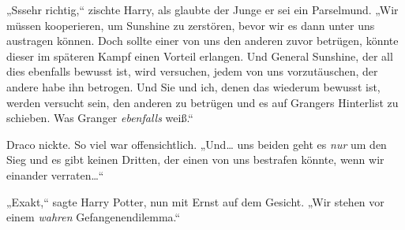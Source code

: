 „Sssehr richtig,“ zischte Harry, als glaubte der Junge er sei ein Parselmund. „Wir müssen kooperieren, um Sunshine zu zerstören, bevor wir es dann unter uns austragen können. Doch sollte einer von uns den anderen zuvor betrügen, könnte dieser im späteren Kampf einen Vorteil erlangen. Und General Sunshine, der all dies ebenfalls bewusst ist, wird versuchen, jedem von uns vorzutäuschen, der andere habe ihn betrogen. Und Sie und ich, denen das wiederum bewusst ist, werden versucht sein, den anderen zu betrügen und es auf Grangers Hinterlist zu schieben. Was Granger \emph{ebenfalls} weiß.“

Draco nickte. So viel war offensichtlich. „Und… uns beiden geht es \emph{nur} um den Sieg und es gibt keinen Dritten, der einen von uns bestrafen könnte, wenn wir einander verraten…“

„Exakt,“ sagte Harry Potter, nun mit Ernst auf dem Gesicht. „Wir stehen vor einem \emph{wahren} Gefangenendilemma.“


